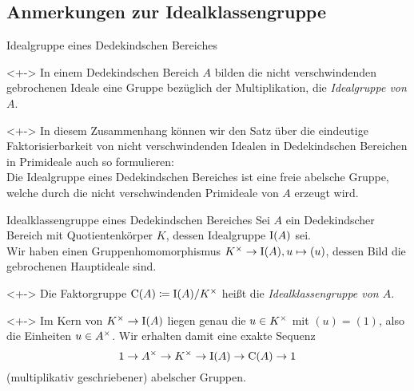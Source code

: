 \subsection{Anmerkungen zur Idealklassengruppe}

\begin{frame}{Idealgruppe eines Dedekindschen Bereiches}
	\begin{corollary}<+->
		In einem Dedekindschen Bereich \(A\) bilden die nicht verschwindenden
		gebrochenen Ideale eine Gruppe bezüglich der Multiplikation, die
		\emph{Idealgruppe von \(A\)}.
	\end{corollary}
	\begin{remark}<+->
		In diesem Zusammenhang können wir den Satz über die eindeutige
		Faktorisierbarkeit von nicht verschwindenden Idealen in Dedekindschen
		Bereichen in Primideale auch so formulieren:
		\\
		Die Idealgruppe eines Dedekindschen Bereiches ist eine freie abelsche
		Gruppe, welche durch die nicht verschwindenden Primideale von \(A\)
		erzeugt wird.
	\end{remark}
\end{frame}

\begin{frame}{Idealklassengruppe eines Dedekindschen Bereiches}
	Sei \(A\) ein Dedekindscher Bereich mit Quotientenkörper \(K\), dessen
	Idealgruppe \(\operatorname{I}(A)\) sei.
	\\
	Wir haben einen Gruppenhomomorphismus \(K^\times \to \operatorname{I}(A),
	u \mapsto (u)\), dessen Bild die gebrochenen Hauptideale sind.
	\begin{definition}<+->
		Die Faktorgruppe \(\operatorname{C}(A) \coloneqq \operatorname{I}(A)/K^\times\) heißt die
		\emph{Idealklassengruppe von \(A\)}.
	\end{definition}
	\begin{remark}<+->
		Im Kern von \(K^\times \to \operatorname{I}(A)\) liegen genau die \(u \in K^\times\) mit
		\((u) = (1)\), also die Einheiten \(u \in A^\times\). Wir erhalten damit
		eine exakte Sequenz
		\[1 \to A^\times \to K^\times \to \operatorname{I}(A) \to \operatorname{C}(A) \to 1\]
		(multiplikativ geschriebener) abelscher Gruppen.
	\end{remark}
\end{frame}

